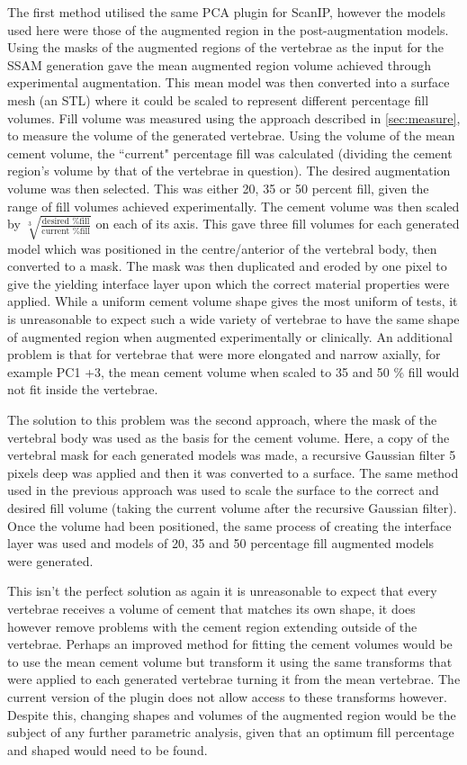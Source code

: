 The first method utilised the same PCA plugin for ScanIP, however the models
used here were those of the augmented region in the post-augmentation models.
Using the masks of the augmented regions of the vertebrae as the input for the
SSAM generation gave the mean augmented region volume achieved through
experimental augmentation. This mean model was then converted into a surface
mesh (an STL) where it could be scaled to represent different percentage fill
volumes. Fill volume was measured using the approach described in
\cref{sec:measure}, to measure the volume of the generated vertebrae. Using the
volume of the mean cement volume, the ``current" percentage fill was calculated
(dividing the cement region's volume by that of the vertebrae in question). The
desired augmentation volume was then selected. This was either 20, 35 or 50
percent fill, given the range of fill volumes achieved experimentally. The
cement volume was then scaled by $\sqrt[3]{\frac{\text{desired \% fill}}{\text{current \%
fill}}}$ on each of its axis. This gave three fill volumes for each
generated model which was positioned in the centre/anterior of the vertebral
body, then converted to a mask. The mask was then duplicated and eroded by one
pixel to give the yielding interface layer upon which the correct material
properties were applied. While a uniform cement volume shape gives the most
uniform of tests, it is unreasonable to expect such a wide variety of vertebrae
to have the same shape of augmented region when augmented experimentally or
clinically. An additional problem is that for vertebrae that were more
elongated and narrow axially, for example PC1 +3, the mean cement volume when
scaled to 35 and 50 \% fill would not fit inside the vertebrae.

The solution to this problem was the second approach, where the mask of the
vertebral body was used as the basis for the cement volume. Here, a copy of the
vertebral mask for each generated models was made, a recursive Gaussian filter
5 pixels deep was applied and then it was converted to a surface. The same
method used in the previous approach was used to scale the surface to the
correct and desired fill volume (taking the current volume after the recursive
Gaussian filter). Once the volume had been positioned, the same process of
creating the interface layer was used and models of 20, 35 and 50 percentage
fill augmented models were generated.

This isn't the perfect solution as again it is unreasonable to expect that
every vertebrae receives a volume of cement that matches its own shape, it does
however remove problems with the cement region extending outside of the
vertebrae. Perhaps an improved method for fitting the cement volumes would be
to use the mean cement volume but transform it using the same transforms that
were applied to each generated vertebrae turning it from the mean vertebrae.
The current version of the plugin does not allow access to these transforms
however. Despite this, changing shapes and volumes of the augmented region would be the
subject of any further parametric analysis, given that an optimum fill
percentage and shaped would need to be found.

